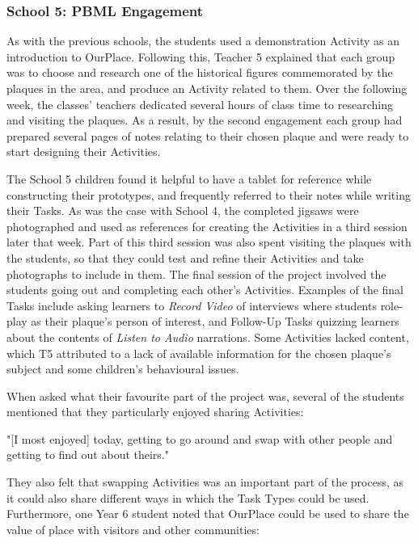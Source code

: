 \subsubsection{School 5: PBML Engagement}
As with the previous schools, the students used a demonstration Activity as an introduction to OurPlace. Following this, Teacher 5 explained that each group was to choose and research one of the historical figures commemorated by the plaques in the area, and produce an Activity related to them. Over the following week, the classes' teachers dedicated several hours of class time to researching and visiting the plaques. As a result, by the second engagement each group had prepared several pages of notes relating to their chosen plaque and were ready to start designing their Activities.

The School 5 children found it helpful to have a tablet for reference while constructing their prototypes, and frequently referred to their notes while writing their Tasks. As was the case with School 4, the completed jigsaws were photographed and used as references for creating the Activities in a third session later that week. Part of this third session was also spent visiting the plaques with the students, so that they could test and refine their Activities and take photographs to include in them. The final session of the project involved the students going out and completing each other's Activities. Examples of the final Tasks include asking learners to \textit{Record Video} of interviews where students role-play as their plaque's person of interest, and Follow-Up Tasks quizzing learners about the contents of \textit{Listen to Audio} narrations. Some Activities lacked content, which T5 attributed to a lack of available information for the chosen plaque's subject and some children's behavioural issues.

When asked what their favourite part of the project was, several of the students mentioned that they particularly enjoyed sharing Activities: 

\begin{displayquote}
"[I most enjoyed] today, getting to go around and swap with other people and getting to find out about theirs."
\end{displayquote}

They also felt that swapping Activities was an important part of the process, as it could also share different ways in which the Task Types could be used. Furthermore, one Year 6 student noted that OurPlace could be used to share the value of place with visitors and other communities: 

